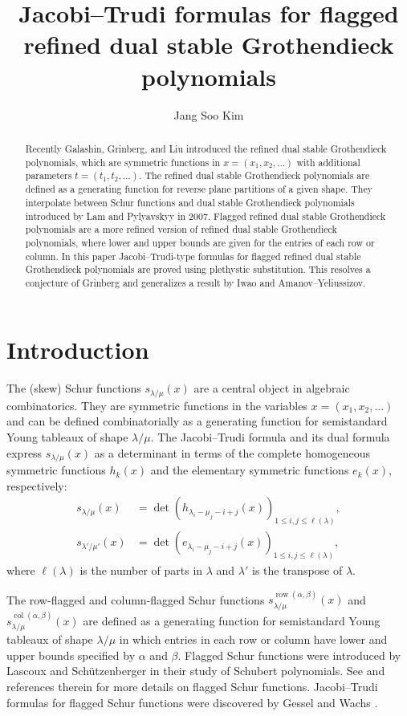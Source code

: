 \documentclass[12pt]{amsart}
\title[Jacobi--Trudi formulas for flagged dual Grothendieck
polynomials]{Jacobi--Trudi formulas for flagged refined dual stable Grothendieck
  polynomials}
\author{Jang Soo Kim}
\numberwithin{equation}{section}
\theoremstyle{definition}
\newcommand\col{\operatorname{col}}
\newcommand\row{\operatorname{row}}
\newcommand\lm{{\lambda/\mu}}
\begin{document}
\begin{abstract}
  Recently Galashin, Grinberg, and Liu introduced the refined dual stable
  Grothendieck polynomials, which are symmetric functions in $x=(x_1,x_2,\dots)$
  with additional parameters $t=(t_1,t_2,\dots)$. The refined dual stable
  Grothendieck polynomials are defined as a generating function for reverse
  plane partitions of a given shape. They interpolate between Schur functions
  and dual stable Grothendieck polynomials introduced by Lam and Pylyavskyy in
  2007. Flagged refined dual stable Grothendieck polynomials are a more refined
  version of refined dual stable Grothendieck polynomials, where lower and upper
  bounds are given for the entries of each row or column. In this paper
  Jacobi--Trudi-type formulas for flagged refined dual stable Grothendieck
  polynomials are proved using plethystic substitution. This resolves a
  conjecture of Grinberg and generalizes a result by Iwao and
  Amanov--Yeliussizov.
\end{abstract}

\maketitle

\section{Introduction}

The (skew) Schur functions $s_{\lm}(x)$ are a central object in algebraic
combinatorics. They are symmetric functions in the variables $x=(x_1,x_2,\dots)$
and can be defined combinatorially as a generating function for semistandard
Young tableaux of shape $\lm$. The Jacobi--Trudi formula and its dual formula
express $s_{\lm}(x)$ as a determinant in terms of the complete homogeneous
symmetric functions $h_k(x)$ and the elementary symmetric functions $e_k(x)$,
respectively:
\begin{align}
  \label{eq:s=det h}
  s_{\lambda/\mu}(x) &= \det
  \left( h_{\lambda_i-\mu_j-i+j} (x) \right)_{1\le i,j\le \ell(\lambda)},\\
  \label{eq:s=det e}
  s_{\lambda'/\mu'}(x) &= \det
  \left( e_{\lambda_i-\mu_j-i+j} (x) \right)_{1\le i,j\le \ell(\lambda)},
\end{align}
where $\ell(\lambda)$ is the number of parts in $\lambda$ and $\lambda'$ is the
transpose of $\lambda$.

The row-flagged and column-flagged Schur functions
$s_{\lambda/\mu}^{\row(\alpha,\beta)}(x)$ and
$s_{\lambda/\mu}^{\col(\alpha,\beta)}(x)$ are defined as a generating function
for semistandard Young tableaux of shape $\lm$ in which entries in each row or
column have lower and upper bounds specified by $\alpha$ and $\beta$. Flagged
Schur functions were introduced by Lascoux and Sch\"utzenberger \cite{LS1982p}
in their study of Schubert polynomials. See \cite{Chen2002, Merzon_2015,
  Wachs_1985} and references therein for more details on flagged Schur
functions. Jacobi--Trudi formulas for flagged Schur functions were discovered by
Gessel \cite{Gessel_unpublished} and Wachs \cite{Wachs_1985}.
\end{document}
